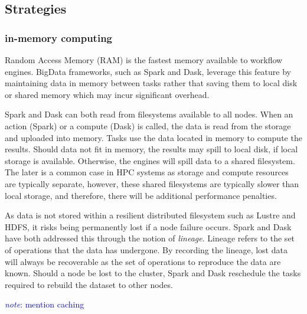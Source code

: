\documentclass{report}
\newcommand{\note}[1]{\textcolor{blue}{\textit{note}: #1}}
\begin{document}
            \subsection{Strategies}
                \subsubsection{in-memory computing}
                    Random Access Memory (RAM) is the fastest memory available
                    to workflow engines. BigData frameworks, such as Spark and 
                    Dask, leverage this feature by maintaining data in memory 
                    between tasks rather that saving them to local disk or 
                    shared memory which may incur significant overhead.

                    Spark and Dask can both read from filesystems available to
                    all nodes. When an action (Spark) or a compute (Dask) is 
                    called, the data is read from the storage and uploaded into
                    memory. Tasks use the data located in memory to compute the
                    results. Should data not fit in memory, the results may 
                    spill to local disk, if local storage is available. 
                    Otherwise, the engines will spill data to a shared 
                    filesystem. The later is a common case in HPC systems as 
                    storage and compute resources are typically separate, 
                    however, these shared filesystems are typically slower than 
                    local storage, and therefore, there will be additional 
                    performance penalties.

                    As data is not stored within a resilient distributed 
                    filesystem such as Lustre and HDFS, it risks being 
                    permanently lost if a node failure occurs. Spark and Dask
                    have both addressed this through the notion of 
                    \textit{lineage}. Lineage refers to the set of operations
                    that the data has undergone. By recording the lineage, lost
                    data will always be recoverable as the set of operations
                    to reproduce the data are known. Should a node be lost to 
                    the cluster, Spark and Dask reschedule the tasks required 
                    to rebuild the dataset to other nodes.

                    \note{mention caching}
\end{document}
